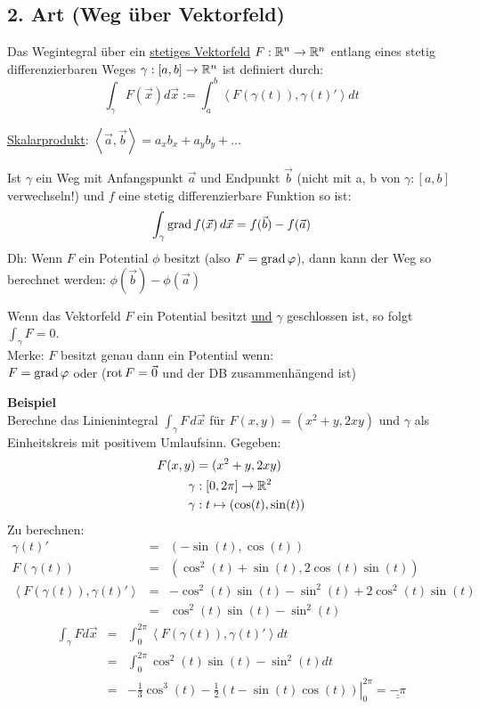 \subsection{2. Art (Weg über Vektorfeld)}
Das Wegintegral über ein \underline{stetiges Vektorfeld} $F: \mathbb{R}^n \to \mathbb{R}^n$
entlang eines stetig differenzierbaren Weges $\gamma: [a,b] \to \mathbb{R}^n$ ist definiert
durch:
\[
\int_\gamma F(\vec{x}) d\vec{x} := \int_a^b \left< F(\gamma(t)), \gamma(t)' \right> dt
\]

\underline{Skalarprodukt}: $\left< \vec{a}, \vec{b} \right> = a_x b_x + a_y b_y + \ldots$

\begin{satz}
Ist $\gamma$ ein Weg mit Anfangspunkt $\vec{a}$ und Endpunkt $\vec{b}$ (nicht mit a, b von $\gamma: [a, b]$ verwechseln!) und $f$ eine stetig differenzierbare Funktion so ist:
\[
	\int_{\gamma} \operatorname{grad} f(\vec{x}) \, d\vec{x} = f(\vec{b}) - f(\vec{a})
\]
Dh: Wenn $F$ ein Potential $\phi$ besitzt (also $F = \operatorname{grad} \varphi$), dann kann der Weg so berechnet werden: $\phi(\vec{b}) - \phi(\vec{a})$
\end{satz}

\begin{lemma}
Wenn das Vektorfeld $F$ ein Potential besitzt \uline{und} $\gamma$ geschlossen ist, so folgt $\int_\gamma F = 0$.\\
Merke: $F$ besitzt genau dann ein Potential wenn:\\
$F = \operatorname{grad} \varphi$ oder ($\operatorname{rot} F = \vec{0}$ und der DB zusammenhängend ist)
\end{lemma}

\textbf{Beispiel}\\
Berechne das Linienintegral $\int_\gamma F \, d\vec{x} $ für $ F(x,y) = (x^2+y, 2xy)$ und $\gamma$ als Einheitskreis mit positivem Umlaufsinn.
Gegeben:
\begin{align*}
F(x,y) &= (x^2+y, 2xy) \\
\gamma &: [0,2\pi]  \to \mathbb{R}^2\\
\gamma &: t \mapsto   (\cos(t), \sin(t)) 
\end{align*}
Zu berechnen:
\begin{eqnarray*}
\gamma(t)' &=& (-\sin(t),\cos(t))\\
F(\gamma(t)) &=& (\cos^2(t) + \sin(t), 2 \cos(t)\sin(t))\\
\left< F(\gamma(t)), \gamma(t)' \right> &=& -\cos^2(t)\sin(t) - \sin^2(t) + 2\cos^2(t)\sin(t)\\
 &=& \cos^2(t)\sin(t) - \sin^2(t)
\end{eqnarray*}
\begin{eqnarray*}
\int_\gamma F d\vec{x} &=& \int_0^{2\pi} \left< F(\gamma(t)), \gamma(t)' \right> dt\\
&=& \int_0^{2\pi} \cos^2(t)\sin(t) - \sin^2(t) dt\\
&=& \left. -\frac{1}{3}\cos^3(t) - \frac{1}{2}(t - \sin(t)\cos(t))
\right|_0^{2\pi} = \underline{\underline{-\pi}}
\end{eqnarray*}

